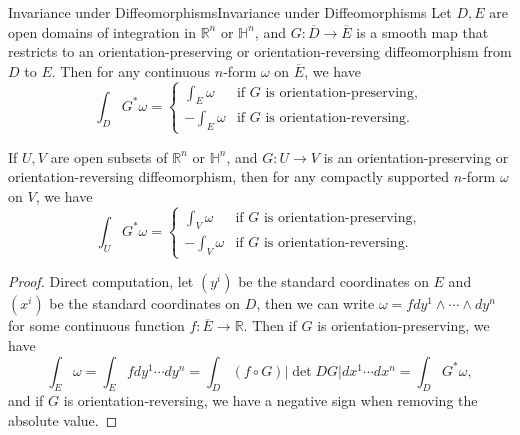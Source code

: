 \documentclass[../main.tex]{subfiles}
\begin{document}
\begin{proposition}{Invariance under Diffeomorphisms}{Invariance under Diffeomorphisms}
  Let $D,E$ are open domains of integration in $\mathbb{R}^n$ or $\mathbb{H}^n$, and $G: \overline{D}\to \overline{E}$ is a smooth map that restricts to an orientation-preserving or orientation-reversing diffeomorphism from $D$ to $E$. Then for any continuous $n$-form $\omega$ on $\overline{E}$, we have
  \begin{equation}
    \int_D G^*\omega = \begin{cases}
      \displaystyle \int_E \omega & \text{if $G$ is orientation-preserving},\\
      \displaystyle -\int_E \omega & \text{if $G$ is orientation-reversing}.
    \end{cases}
  \end{equation}

  If $U, V$ are open subsets of $\mathbb{R}^n$ or $\mathbb{H}^n$, and $G: U\to V$ is an orientation-preserving or orientation-reversing diffeomorphism, then for any compactly supported $n$-form $\omega$ on $V$, we have
  \begin{equation}
    \int_U G^*\omega = \begin{cases}
      \displaystyle \int_V \omega & \text{if $G$ is orientation-preserving},\\
      \displaystyle -\int_V \omega & \text{if $G$ is orientation-reversing}.
    \end{cases}
  \end{equation}
\end{proposition}
\begin{proof}
  Direct computation, let $(y^i)$ be the standard coordinates on $E$ and $(x^i)$ be the standard coordinates on $D$, then we can write $\omega=f dy^1\wedge \cdots \wedge dy^n$ for some continuous function $f:\overline{E}\to \mathbb{R}$. Then if $G$ is orientation-preserving, we have
  \begin{equation*}
    \int_E \omega = \int_E f dy^1\cdots dy^n = \int_D (f\circ G) |\det DG| dx^1\cdots dx^n = \int_D G^*\omega,
  \end{equation*}
  and if $G$ is orientation-reversing, we have a negative sign when removing the absolute value.
\end{proof}
\end{document}
